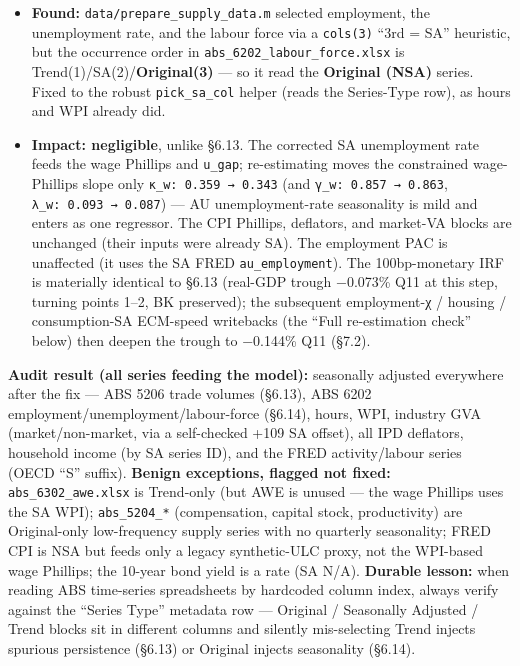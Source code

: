 \documentclass[
]{article}
\providecommand{\tightlist}{%
  \setlength{\itemsep}{0pt}\setlength{\parskip}{0pt}}
\begin{document}
\begin{itemize}
\tightlist
\item
  \textbf{Found:} \texttt{data/prepare\_supply\_data.m} selected
  employment, the unemployment rate, and the labour force via a
  \texttt{cols(3)} ``3rd = SA'' heuristic, but the occurrence order in
  \texttt{abs\_6202\_labour\_force.xlsx} is
  Trend(1)/SA(2)/\textbf{Original(3)} --- so it read the
  \textbf{Original (NSA)} series. Fixed to the robust
  \texttt{pick\_sa\_col} helper (reads the Series-Type row), as hours
  and WPI already did.
\item
  \textbf{Impact: negligible}, unlike §6.13. The corrected SA
  unemployment rate feeds the wage Phillips and \texttt{u\_gap};
  re-estimating moves the constrained wage-Phillips slope only
  \texttt{κ\_w:\ 0.359\ →\ 0.343} (and \texttt{γ\_w:\ 0.857\ →\ 0.863},
  \texttt{λ\_w:\ 0.093\ →\ 0.087}) --- AU unemployment-rate seasonality
  is mild and enters as one regressor. The CPI Phillips, deflators, and
  market-VA blocks are unchanged (their inputs were already SA). The
  employment PAC is unaffected (it uses the SA FRED
  \texttt{au\_employment}). The 100bp-monetary IRF is materially
  identical to §6.13 (real-GDP trough −0.073\% Q11 at this step, turning
  points 1--2, BK preserved); the subsequent employment-χ / housing /
  consumption-SA ECM-speed writebacks (the ``Full re-estimation check''
  below) then deepen the trough to −0.144\% Q11 (§7.2).
\end{itemize}

\textbf{Audit result (all series feeding the model):} seasonally
adjusted everywhere after the fix --- ABS 5206 trade volumes (§6.13),
ABS 6202 employment/unemployment/labour-force (§6.14), hours, WPI,
industry GVA (market/non-market, via a self-checked +109 SA offset), all
IPD deflators, household income (by SA series ID), and the FRED
activity/labour series (OECD ``S'' suffix). \textbf{Benign exceptions,
flagged not fixed:} \texttt{abs\_6302\_awe.xlsx} is Trend-only (but AWE
is unused --- the wage Phillips uses the SA WPI); \texttt{abs\_5204\_*}
(compensation, capital stock, productivity) are Original-only
low-frequency supply series with no quarterly seasonality; FRED CPI is
NSA but feeds only a legacy synthetic-ULC proxy, not the WPI-based wage
Phillips; the 10-year bond yield is a rate (SA N/A). \textbf{Durable
lesson:} when reading ABS time-series spreadsheets by hardcoded column
index, always verify against the ``Series Type'' metadata row ---
Original / Seasonally Adjusted / Trend blocks sit in different columns
and silently mis-selecting Trend injects spurious persistence (§6.13) or
Original injects seasonality (§6.14).
\end{document}
